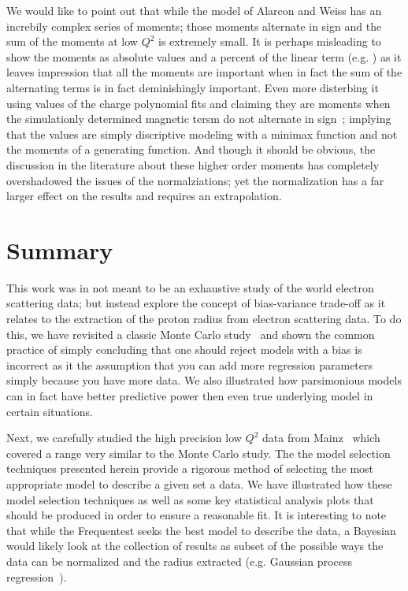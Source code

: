 \documentclass[10pt,aps,prc,twocolumn]{revtex4-1}
\begin{document}
We would like to point out that while the model of Alarcon and Weiss has an increbily complex series
of moments; those moments alternate in sign and the sum of the moments at low $Q^2$ is extremely small.   
It is perhaps misleading to show  the moments as absolute values and a percent of the linear term
(e.g. \cite{Sick:2017aor,Sick:2018fzn}) as it leaves impression that all the moments are 
important when in fact the sum of the alternating terms is in fact deminishingly important.  
Even more disterbing it using values of the charge polynomial fits and claiming they are moments when
the simulationly determined magnetic tersm do not alternate in sign~\cite{Bernauer:2010zga}; implying 
that the values are simply discriptive modeling with a minimax function and not the moments of a 
generating function.
And though it should be obvious, the discussion in the literature about these higher order moments has 
completely overshadowed the issues of the normalziations; yet the normalization has a far larger effect 
on the results and requires an extrapolation.


\section{Summary}

This work was in not meant to be an exhaustive study of the world electron scattering data; but 
instead explore the concept of bias-variance trade-off as it relates to the extraction of the proton 
radius from electron scattering data.
To do this, we have revisited a classic Monte Carlo study~\cite{Borkowski:1975ume} and shown
the common practice of simply concluding that one should reject models with a bias is incorrect
as it the assumption that you can add more regression parameters simply because you have more data.  
We also illustrated how parsimonious models can in fact have better 
predictive power then even true underlying model in certain situations. 

Next, we carefully studied the high precision low $Q^2$ data from Mainz~\cite{Bernauer:2010wm} which covered a range
very similar to the Monte Carlo study.  The the model selection techniques
presented herein provide a rigorous method of selecting the most appropriate model to describe a given
set a data.  We have illustrated how these model selection techniques as well as some key statistical 
analysis plots that should be produced in order to ensure a reasonable fit.   
It is interesting to note that while the Frequentest
seeks the best model to describe the data, a Bayesian would likely look at the collection of results as  
subset of the possible ways the data can be normalized and the radius extracted (e.g. Gaussian process 
regression~\cite{Rasmussen:2005}).    
\end{document}
